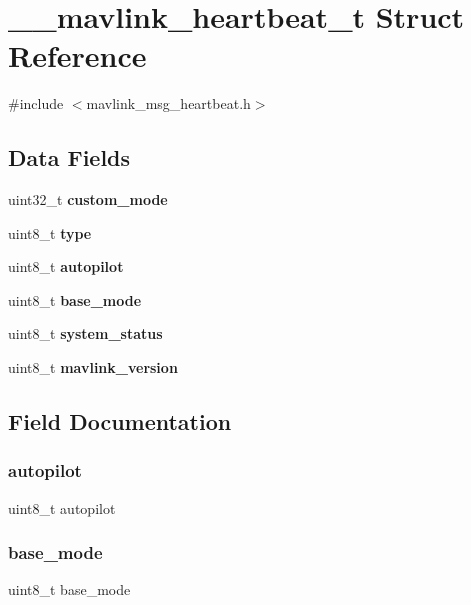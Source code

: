 \section{\+\_\+\+\_\+mavlink\+\_\+heartbeat\+\_\+t Struct Reference}
\label{struct____mavlink__heartbeat__t}


{\ttfamily \#include $<$mavlink\+\_\+msg\+\_\+heartbeat.\+h$>$}

\subsection*{Data Fields}
\begin{DoxyCompactItemize}
\item 
uint32\+\_\+t \textbf{ custom\+\_\+mode}
\item 
uint8\+\_\+t \textbf{ type}
\item 
uint8\+\_\+t \textbf{ autopilot}
\item 
uint8\+\_\+t \textbf{ base\+\_\+mode}
\item 
uint8\+\_\+t \textbf{ system\+\_\+status}
\item 
uint8\+\_\+t \textbf{ mavlink\+\_\+version}
\end{DoxyCompactItemize}


\subsection{Field Documentation}
\mbox{\label{struct____mavlink__heartbeat__t_a081b1dee547a4fb4499588542427d139}} 
\subsubsection{autopilot}
{\footnotesize\ttfamily uint8\+\_\+t autopilot}

\mbox{\label{struct____mavlink__heartbeat__t_a104988824a5f2c21b6b0eb5c53f007e2}} 
\subsubsection{base\+\_\+mode}
{\footnotesize\ttfamily uint8\+\_\+t base\+\_\+mode}

